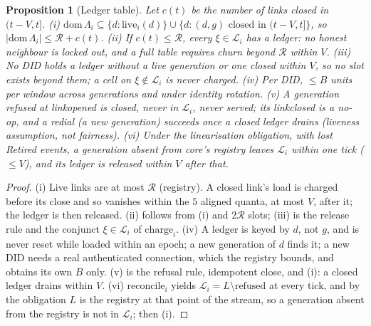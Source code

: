 \documentclass[journal]{IEEEtran}
\newtheorem{proposition}{Proposition}
\DeclareRobustCommand{\code}[1]{{\ttfamily\renewcommand{\_}{\textunderscore\allowbreak}#1}}
\begin{document}
\begin{proposition}[Ledger table]\label{prop:ledger}
Let $c(t)$ be the number of links closed in $(t-V,t]$.
(i) $\mathrm{dom}\,\Lambda_i\subseteq\{d:\mathrm{live}_i(d)\}\cup
\{d:(d,g)\text{ closed in }(t-V,t]\}$, so
$|\mathrm{dom}\,\Lambda_i|\le\mathcal R+c(t)$.
(ii) If $c(t)\le\mathcal R$, every $\xi\in\mathcal L_i$ has a ledger: no
honest neighbour is locked out, and a full table requires churn beyond
$\mathcal R$ within $V$.
(iii) No DID holds a ledger without a live generation or one closed
within $V$, so no slot exists beyond them; a cell on $\xi\notin\mathcal
L_i$ is never charged.
(iv) Per DID, $\le B$ units per window across generations and under
identity rotation.
(v) A generation refused at \code{link\_opened} is closed, never in
$\mathcal L_i$, never served; its \code{link\_closed} is a no-op, and a
redial (a new generation) succeeds once a closed ledger drains (liveness
assumption, not fairness).
(vi) Under the linearisation obligation, with lost \code{Retired}
events, a generation absent from core's registry leaves $\mathcal L_i$
within one tick ($\le V$), and its ledger is released within $V$ after
that.
\end{proposition}
\begin{proof}
(i) Live links are at most $\mathcal R$ (registry).  A closed link's load
is charged before its close and so vanishes within the $5$ aligned
quanta, at most $V$, after it; the ledger is then released.  (ii) follows
from (i) and $2\mathcal R$ slots; (iii) is the release rule and the
conjunct $\xi\in\mathcal L_i$ of $\mathrm{charge}_i$.  (iv) A ledger is
keyed by $d$, not $g$, and is never reset while loaded within an epoch;
a new generation of $d$ finds it; a new DID needs a real authenticated
connection, which the registry bounds, and obtains its own $B$ only.
(v) is the refusal rule, idempotent close, and (i): a closed ledger
drains within $V$.  (vi) $\mathrm{reconcile}_i$ yields
$\mathcal L_i=L\setminus\mathrm{refused}$ at every tick, and by the
obligation $L$ is the registry at that point of the stream, so a
generation absent from the registry is not in $\mathcal L_i$; then (i).
\end{proof}
\end{document}
